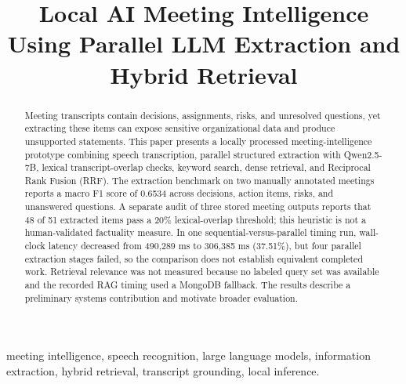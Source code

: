 \documentclass[conference]{IEEEtran}
\begin{document}
\title{Local AI Meeting Intelligence Using Parallel LLM Extraction and Hybrid Retrieval}

\author{
\and
{}
}

\maketitle

\begin{abstract}
Meeting transcripts contain decisions, assignments, risks, and unresolved questions, yet extracting these items can expose sensitive organizational data and produce unsupported statements. This paper presents a locally processed meeting-intelligence prototype combining speech transcription, parallel structured extraction with Qwen2.5-7B, lexical transcript-overlap checks, keyword search, dense retrieval, and Reciprocal Rank Fusion (RRF). The extraction benchmark on two manually annotated meetings reports a macro F1 score of 0.6534 across decisions, action items, risks, and unanswered questions. A separate audit of three stored meeting outputs reports that 48 of 51 extracted items pass a 20\% lexical-overlap threshold; this heuristic is not a human-validated factuality measure. In one sequential-versus-parallel timing run, wall-clock latency decreased from 490,289 ms to 306,385 ms (37.51\%), but four parallel extraction stages failed, so the comparison does not establish equivalent completed work. Retrieval relevance was not measured because no labeled query set was available and the recorded RAG timing used a MongoDB fallback. The results describe a preliminary systems contribution and motivate broader evaluation.
\end{abstract}

\begin{IEEEkeywords}
meeting intelligence, speech recognition, large language models, information extraction, hybrid retrieval, transcript grounding, local inference.
\end{IEEEkeywords}
\end{document}
